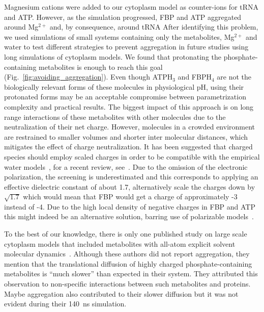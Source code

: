 \documentclass[journal=jpcisd8,manuscript=article]{achemso}
\begin{document}
Magnesium cations were added to our cytoplasm model as counter-ions
for tRNA and ATP. However, as the simulation progressed, FBP and ATP
aggregated around Mg$^{2+}$ and, by consequence, around tRNA
  After identifying this problem, we used simulations of
small systems containing only the metabolites, Mg$^{2+}$ and water to
test different strategies to prevent aggregation in future studies
using long simulations of cytoplasm models. We found that protonating
the phosphate-containing metabolites is enough to reach this goal
(Fig.~\ref{fig:avoiding_aggregation}). Even though ATPH$_3$ and
FBPH$_4$ are not the biologically relevant forms of these molecules in
physiological pH, using their protonated forms may be an acceptable
compromise between parametrization complexity and practical
results. The biggest impact of this approach is on long range
interactions of these metabolites with other molecules due to the
neutralization of their net charge. However, molecules in a crowded
environment are restrained to smaller volumes and shorter inter
molecular distances, which mitigates the effect of charge
neutralization. It has been suggested that charged species should
employ scaled charges in order to be compatible with the empirical
water models~\cite{Leontyev2009a,Leontyev2011a}, for a recent review, 
see~\cite{Kirby2019a}. Due to the omission
of the electronic polarization, the screening is underestimated and this
corresponds to applying an effective dielectric constant of about 1.7, alternatively scale the charges down by $\sqrt{1.7}$ which would mean that FBP would get a charge of approximately -3 instead of -4.
Due to the high local
density of negative charges in FBP and ATP this might indeed be an
alternative solution, barring use of polarizable
models~\cite{Ponder2010a,Lopes2013a,Ghahremanpour2018b,Walz2018a,Walz2019b}.


To the best of our knowledge, there is only one published study on
large scale cytoplasm models that included metabolites with all-atom
explicit solvent molecular dynamics~\cite{Yu2016a}. Although these
authors did not report aggregation, they mention that the
translational diffusion of highly charged phosphate-containing
metabolites is ``much slower'' than expected in their system. They
attributed this observation to non-specific interactions between such
metabolites and proteins. Maybe aggregation also contributed to their
slower diffusion but it was not evident during their
\SI{140}{\nano\second} simulation.
\end{document}
